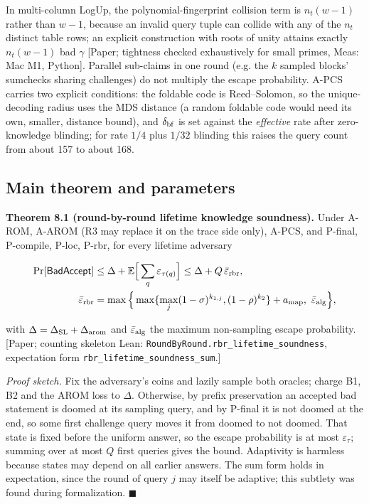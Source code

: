\documentclass[10pt]{article}
\begin{document}
In multi-column LogUp, the polynomial-fingerprint collision term is $n_t(w-1)$ rather than $w-1$, because an invalid query tuple can collide with any of the $n_t$ distinct table rows; an explicit construction with roots of unity attains exactly $n_t(w-1)$ bad $\gamma$ [Paper; tightness checked exhaustively for small primes, Meas: Mac M1, Python]. Parallel sub-claims in one round (e.g. the $k$ sampled blocks' sumchecks sharing challenges) do not multiply the escape probability. A-PCS carries two explicit conditions: the foldable code is Reed--Solomon, so the unique-decoding radius uses the MDS distance (a random foldable code \cite{ZCF24} would need its own, smaller, distance bound), and $\delta_{\rm bf}$ is set against the \emph{effective} rate after zero-knowledge blinding; for rate $1/4$ plus $1/32$ blinding this raises the query count from about 157 to about 168.

\subsection{Main theorem and parameters}
\textbf{Theorem 8.1 (round-by-round lifetime knowledge soundness).} Under A-ROM, A-AROM (R3 may replace it on the trace side only), A-PCS, and P-final, P-compile, P-loc, P-rbr, for every lifetime adversary

\[\begin{aligned}\Pr[\mathsf{BadAccept}]&\le\Delta+\mathbb E\Big[\sum_q\varepsilon_{\tau(q)}\Big]\le\Delta+Q\,\bar\varepsilon_{\rm rbr},\\ \bar\varepsilon_{\rm rbr}&=\max\Big\{\max\{\max_j(1-\sigma)^{k_{1,j}},(1-\rho)^{k_2}\}+a_{\rm map},\ \bar\varepsilon_{\rm alg}\Big\},\end{aligned}\]

with $\Delta=\Delta_{\rm SL}+\Delta_{\rm arom}$ and $\bar\varepsilon_{\rm alg}$ the maximum non-sampling escape probability. [Paper; counting skeleton Lean: \texttt{RoundByRound.\allowbreak{}rbr\_\allowbreak{}lifetime\_\allowbreak{}soundness}, expectation form \texttt{rbr\_\allowbreak{}lifetime\_\allowbreak{}soundness\_\allowbreak{}sum}.]

\emph{Proof sketch.} Fix the adversary's coins and lazily sample both oracles; charge B1, B2 and the AROM loss to $\Delta$. Otherwise, by prefix preservation an accepted bad statement is doomed at its sampling query, and by P-final it is not doomed at the end, so some first challenge query moves it from doomed to not doomed. That state is fixed before the uniform answer, so the escape probability is at most $\varepsilon_\tau$; summing over at most $Q$ first queries gives the bound. Adaptivity is harmless because states may depend on all earlier answers. The sum form holds in expectation, since the round of query $j$ may itself be adaptive; this subtlety was found during formalization. $\blacksquare$
\end{document}
